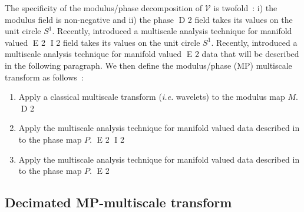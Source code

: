 The specificity of the modulus/phase decomposition of $\mathcal{V}$ is twofold~: i) the modulus field is non-negative and ii) the phase 
D 2
field takes its values on the unit circle $S^1$. Recently, \cite{rahman05} introduced a multiscale analysis technique for manifold valued 
E 2
I 2
field takes its values on the unit circle $S^1$. Recently, \citep{rahman05} introduced a multiscale analysis technique for manifold valued 
E 2
data that will be described in the following paragraph. We then define the modulus/phase (MP) multiscale transform as follows~:
\vspace{.1cm}
\begin{center}
\begin{minipage}[b]{0.85\linewidth}
\footnotesize{
\begin{enumerate}
\item Apply a classical multiscale transform (\textit{i.e.} wavelets) to the modulus map $M$.
D 2
\item Apply the multiscale analysis technique for manifold valued data described in \cite{rahman05} to the phase map $P$. 
E 2
I 2
\item Apply the multiscale analysis technique for manifold valued data described in \citep{rahman05} to the phase map $P$. 
E 2
\end{enumerate}}
\end{minipage}
\end{center}
\vspace{.1cm}

\subsection{Decimated MP-multiscale transform}

